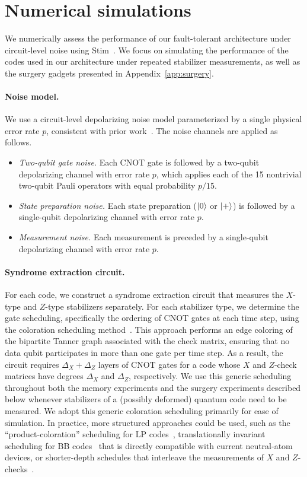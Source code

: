\documentclass[reprint,twocolumn,secnumarabic,amssymb, aps, prx]{revtex4-2}
\begin{document}
\section{Numerical simulations\label{app:numerics}}
We numerically assess the performance of our fault-tolerant architecture under circuit-level noise using Stim~\cite{gidney2021stim}. We focus on simulating the performance of the codes used in our architecture under repeated stabilizer measurements, as well as the surgery gadgets presented in Appendix~\ref{app:surgery}.

\paragraph{Noise model.}
We use a circuit-level depolarizing noise model parameterized by a single physical error rate $p$, consistent with prior work~\cite{xu2024constant, menon2025magic, li2025transversal}. The noise channels are applied as follows.
\begin{itemize}
    \item \emph{Two-qubit gate noise.} Each CNOT gate is followed by a two-qubit depolarizing channel with error rate $p$, which applies each of the 15 nontrivial two-qubit Pauli operators with equal probability $p/15$.
    \item \emph{State preparation noise.} Each state preparation ($\ket{0}$ or $\ket{+}$) is followed by a single-qubit depolarizing channel with error rate $p$. 
    \item \emph{Measurement noise.} Each measurement is preceded by a single-qubit depolarizing channel with error rate $p$.
\end{itemize}

\paragraph{Syndrome extraction circuit.}
For each code, we construct a syndrome extraction circuit that measures the $X$-type and $Z$-type stabilizers separately. For each stabilizer type, we determine the gate scheduling, specifically the ordering of CNOT gates at each time step, using the coloration scheduling method~\cite{tremblay2022constant}. This approach performs an edge coloring of the bipartite Tanner graph associated with the check matrix, ensuring that no data qubit participates in more than one gate per time step. As a result, the circuit requires $\Delta_X + \Delta_Z$ layers of CNOT gates for a code whose $X$ and $Z$-check matrices have degrees $\Delta_X$ and $\Delta_Z$, respectively. We use this generic scheduling throughout both the memory experiments and the surgery experiments described below whenever stabilizers of a (possibly deformed) quantum code need to be measured. We adopt this generic coloration scheduling primarily for ease of simulation. In practice, more structured approaches could be used, such as the ``product-coloration'' scheduling for LP codes~\cite{xu2024constant}, translationally invariant scheduling for BB codes~\cite{bravyi2024high, viszlai2023matching} that is directly compatible with current neutral-atom devices, or shorter-depth schedules that interleave the measurements of $X$ and $Z$-checks~\cite{xu2024constant, kang2025quits}. 
\end{document}
